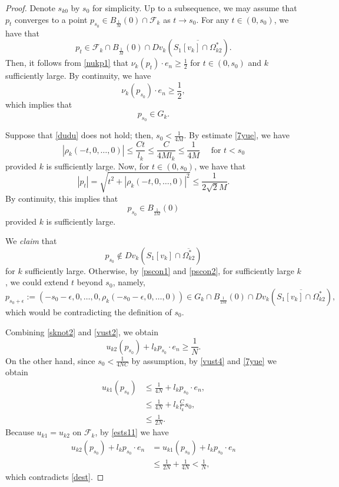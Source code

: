 \documentclass[10pt,a4paper]{amsart}
\begin{document}
\begin{proof}
Denote \( s_{k0} \) by \( s_0 \) for simplicity. Up to a subsequence, we may assume that
\( p_t \) converges to a point \( p_{s_0} \in B_{\frac{1}{M}}(0) \cap \mathcal{F}_k \) as \( t\rightarrow s_0 \).
For any \( t \in (0, s_0) \), we have that 
\[
p_{t} \in \mathcal{F}_k \cap B_{\frac{1}{M}}(0) \cap Dv_k(\overline{S_1[v_k] \cap \Omega^*_{k2}}).
\]
Then, it follows from \eqref{nukp1} that \( \nu_k(p_t) \cdot e_n \geq \frac{1}{2} \) for \( t \in (0, s_0) \) and \( k \) sufficiently large.
By continuity, we have
\[
\nu_k(p_{s_0}) \cdot e_n \geq \frac{1}{2},
\]
which implies that 
\begin{equation}\label{pscon1}
p_{s_0} \in G_k.
\end{equation}

Suppose that \eqref{dudu} does not hold; then, \( s_0 < \frac{1}{4M} \).
By estimate \eqref{7yue}, we have 
\[
|\rho_k(-t, 0, \ldots, 0)| \leq \frac{Ct}{l_k} \leq \frac{C}{4Ml_k} \leq \frac{1}{4M} \quad\text{ for } t < s_0
\] 
provided \( k \) is sufficiently large.
Now, for \( t \in (0, s_0) \), we have that 
\[
|p_t| = \sqrt{t^2 + |\rho_k(-t, 0, \ldots, 0)|^2} \leq \frac{1}{2\sqrt{2}M}.
\]
By continuity, this implies that 
\begin{equation}\label{pscon2}
p_{s_0} \in B_{\frac{1}{2M}}(0)
\end{equation}
provided \( k \) is sufficiently large.

We \emph{claim} that 
\begin{equation}\label{sknot2}
p_{s_0} \notin Dv_k\left(S_1[v_k] \cap \overline{\Omega^*_{k2}}\right)
\end{equation}
for \( k \) sufficiently large.
Otherwise, by \eqref{pscon1} and \eqref{pscon2}, for sufficiently large \( k \), we could extend \( t \) beyond \( s_0 \), namely,
\[
p_{s_0+\epsilon} := (-s_0-\epsilon, 0, \ldots, 0, \rho_k(-s_0-\epsilon, 0, \ldots, 0)) \in G_k \cap B_{\frac{1}{2M}}(0) \cap Dv_k\left(\overline{S_1[v_k] \cap \Omega^*_{k2}}\right),
\]
which would be contradicting the definition of \( s_0 \).

 
 
Combining \eqref{sknot2} and \eqref{vust2},
we obtain
\begin{equation}\label{dest}
u_{k2}(p_{s_0}) + l_kp_{s_0} \cdot e_n \geq \frac{1}{N}.
\end{equation}
On the other hand, since $s_0<\frac{1}{4NC}$ by assumption, by \eqref{vust4} and \eqref{7yue} we obtain
	\begin{align}
		u_{k1}(p_{s_0}) &\leq \frac{1}{4N} + l_kp_{s_0} \cdot e_n, \nonumber \\
			&\leq \frac{1}{4N} + l_k\frac{C}{l_k}s_0, \label{ests11} \\
			&\leq \frac{1}{2N}. \nonumber 
	\end{align}
Because \( u_{k1} = u_{k2} \) on \( \mathcal{F}_k \), by \eqref{ests11} we have
\begin{align*}
u_{k2}(p_{s_0}) + l_kp_{s_0} \cdot e_n &= u_{k1}(p_{s_0}) + l_kp_{s_0} \cdot e_n \\
&\leq \frac{1}{2N} + \frac{1}{4N} < \frac{1}{N},
\end{align*}
which contradicts \eqref{dest}.
\end{proof}
\end{document}
